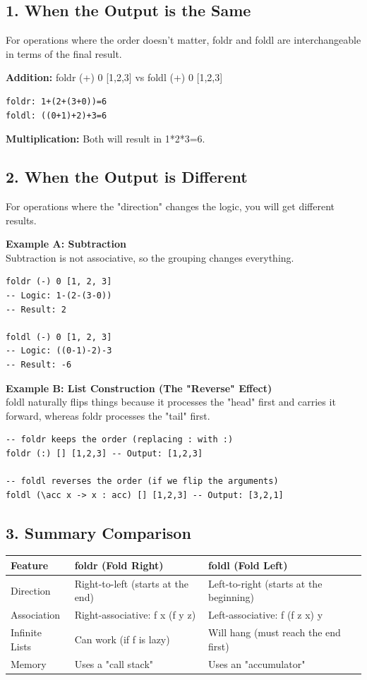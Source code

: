 \documentclass[12pt]{article}
\begin{document}
\subsection{1. When the Output is the Same}
For operations where the order doesn't matter, foldr and foldl are interchangeable in terms of the final result.

\textbf{Addition:} foldr (+) 0 [1,2,3] vs foldl (+) 0 [1,2,3]

\begin{verbatim}
foldr: 1+(2+(3+0))=6
foldl: ((0+1)+2)+3=6
\end{verbatim}

\textbf{Multiplication:} Both will result in 1*2*3=6.

\subsection{2. When the Output is Different}
For operations where the "direction" changes the logic, you will get different results.

\textbf{Example A: Subtraction} \\
Subtraction is not associative, so the grouping changes everything.

\begin{verbatim}
foldr (-) 0 [1, 2, 3]
-- Logic: 1-(2-(3-0))
-- Result: 2

foldl (-) 0 [1, 2, 3]
-- Logic: ((0-1)-2)-3
-- Result: -6
\end{verbatim}

\textbf{Example B: List Construction (The "Reverse" Effect)} \\
foldl naturally flips things because it processes the "head" first and carries it forward, whereas foldr processes the "tail" first.

\begin{verbatim}
-- foldr keeps the order (replacing : with :)
foldr (:) [] [1,2,3] -- Output: [1,2,3]

-- foldl reverses the order (if we flip the arguments)
foldl (\acc x -> x : acc) [] [1,2,3] -- Output: [3,2,1]
\end{verbatim}

\subsection{3. Summary Comparison}

\begin{tabular}{|l|l|l|}
    \hline
    Feature        & foldr (Fold Right)                & foldl (Fold Left)                       \\
    \hline
    Direction      & Right-to-left (starts at the end) & Left-to-right (starts at the beginning) \\
    Association    & Right-associative: f x (f y z)    & Left-associative: f (f z x) y           \\
    Infinite Lists & Can work (if f is lazy)           & Will hang (must reach the end first)    \\
    Memory         & Uses a "call stack"               & Uses an "accumulator"                   \\
    \hline
\end{tabular}
\end{document}

